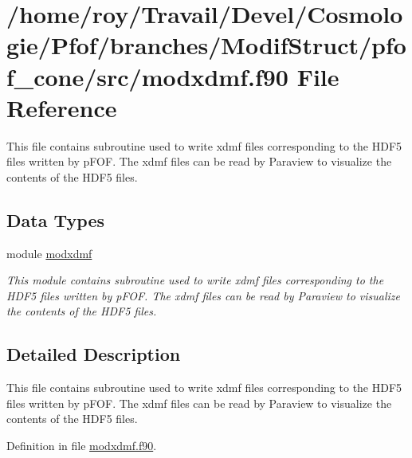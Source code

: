 \hypertarget{modxdmf_8f90}{\section{/home/roy/\-Travail/\-Devel/\-Cosmologie/\-Pfof/branches/\-Modif\-Struct/pfof\-\_\-cone/src/modxdmf.f90 File Reference}
\label{modxdmf_8f90}
}


This file contains subroutine used to write xdmf files corresponding to the H\-D\-F5 files written by p\-F\-O\-F. The xdmf files can be read by Paraview to visualize the contents of the H\-D\-F5 files.  


\subsection*{Data Types}
\begin{DoxyCompactItemize}
\item 
module \hyperlink{classmodxdmf}{modxdmf}
\begin{DoxyCompactList}\small\item\em This module contains subroutine used to write xdmf files corresponding to the H\-D\-F5 files written by p\-F\-O\-F. The xdmf files can be read by Paraview to visualize the contents of the H\-D\-F5 files. \end{DoxyCompactList}\end{DoxyCompactItemize}


\subsection{Detailed Description}
This file contains subroutine used to write xdmf files corresponding to the H\-D\-F5 files written by p\-F\-O\-F. The xdmf files can be read by Paraview to visualize the contents of the H\-D\-F5 files. 

Definition in file \hyperlink{modxdmf_8f90_source}{modxdmf.\-f90}.

